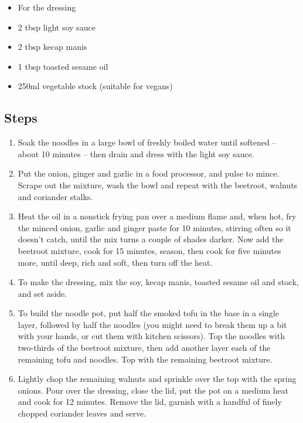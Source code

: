 \documentclass{book}
\begin{document}
\begin{itemize}
\item For the dressing
\item 2 tbsp light soy sauce
\item 2 tbsp kecap manis
\item 1 tbsp toasted sesame oil
\item 250ml vegetable stock (suitable for vegans)
\end{itemize}

\subsection*{Steps}
\begin{enumerate}
\item Soak the noodles in a large bowl of freshly boiled water until softened – about 10 minutes – then drain and dress with the light soy sauce.
\item Put the onion, ginger and garlic in a food processor, and pulse to mince. Scrape out the mixture, wash the bowl and repeat with the beetroot, walnuts and coriander stalks.
\item Heat the oil in a nonstick frying pan over a medium flame and, when hot, fry the minced onion, garlic and ginger paste for 10 minutes, stirring often so it doesn’t catch, until the mix turns a couple of shades darker. Now add the beetroot mixture, cook for 15 minutes, season, then cook for five minutes more, until deep, rich and soft, then turn off the heat.
\item To make the dressing, mix the soy, kecap manis, toasted sesame oil and stock, and set aside.
\item To build the noodle pot, put half the smoked tofu in the base in a single layer, followed by half the noodles (you might need to break them up a bit with your hands, or cut them with kitchen scissors). Top the noodles with two-thirds of the beetroot mixture, then add another layer each of the remaining tofu and noodles. Top with the remaining beetroot mixture.
\item Lightly chop the remaining walnuts and sprinkle over the top with the spring onions. Pour over the dressing, close the lid, put the pot on a medium heat and cook for 12 minutes. Remove the lid, garnish with a handful of finely chopped coriander leaves and serve.
\end{enumerate}
\newpage
\end{document}
